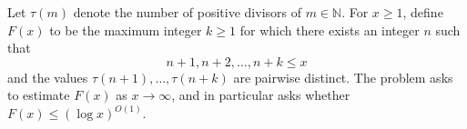 Let $\tau(m)$ denote the number of positive divisors of $m\in\mathbb{N}$.
For $x\ge 1$, define $F(x)$ to be the maximum integer $k\ge 1$ for which there exists an integer $n$ such that
\[
 n+1, n+2,\dots,n+k \le x
\]
and the values $\tau(n+1),\dots,\tau(n+k)$ are pairwise distinct.
The problem asks to estimate $F(x)$ as $x\to\infty$, and in particular asks whether $F(x)\le (\log x)^{O(1)}$.
